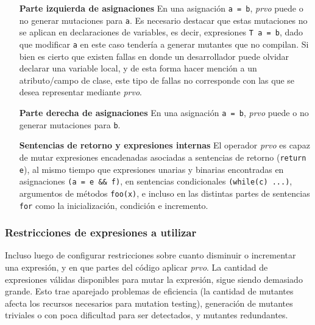 \begin{enumerate}[leftmargin=.75cm,align=left]
	\item[\textbf{Parte izquierda de asignaciones}] En una asignaci\'on \texttt{a = b}, \emph{prvo} puede o no generar mutaciones para \texttt{a}. Es necesario destacar que estas mutaciones no se aplican en declaraciones de variables, es decir, expresiones \texttt{T a = b}, dado que modificar \texttt{a} en este caso tender\'ia a generar mutantes que no compilan. Si bien es cierto que existen fallas en donde un desarrollador puede olvidar declarar una variable local, y de esta forma hacer menci\'on a un atributo/campo de clase, este tipo de fallas no corresponde con las que se desea representar mediante \emph{prvo}.
	
	\item[\textbf{Parte derecha de asignaciones}] En una asignaci\'on \texttt{a = b}, \emph{prvo} puede o no generar mutaciones para \texttt{b}.
	
	\item[\textbf{Sentencias de retorno y expresiones internas}] El operador \emph{prvo} es capaz de mutar expresiones encadenadas asociadas a sentencias de retorno (\texttt{return e}), al mismo tiempo que expresiones unarias y binarias encontradas en asignaciones \texttt{(a = e \&\& f)}, en sentencias condicionales \texttt{(while(c) ...)}, argumentos de m\'etodos \texttt{foo(x)}, e incluso en las distintas partes de sentencias \texttt{for} como la inicializaci\'on, condici\'on e incremento.
\end{enumerate}

\subsubsection{Restricciones de expresiones a utilizar}

Incluso luego de configurar restricciones sobre cuanto disminuir o incrementar una expresi\'on, y en que partes del c\'odigo aplicar \emph{prvo}. La cantidad de expresiones v\'alidas disponibles para mutar la expresi\'on, sigue siendo demasiado grande. Esto trae aparejado problemas de eficiencia (la cantidad de mutantes afecta los recursos necesarios para mutation testing), generaci\'on de mutantes triviales o con poca dificultad para ser detectados, y mutantes redundantes.

